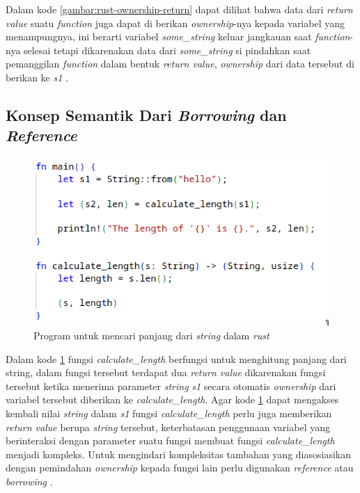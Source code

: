Dalam kode \ref{gambar:rust-ownership-return} dapat dilihat bahwa data dari \emph{return value} suatu \emph{function} juga dapat di berikan \emph{ownership}-nya kepada variabel yang menampungnya, ini berarti variabel \emph{some\_string} keluar jangkauan saat \emph{function}-nya selesai tetapi dikarenakan data dari \emph{some\_string} si pindahkan saat pemanggilan \emph{function} dalam bentuk \emph{return value},  \emph{ownership} dari data tersebut di berikan ke \emph{s1} \citep{rustbook}.

\subsection{Konsep Semantik Dari \emph{Borrowing} dan \emph{Reference}}

\begin{figure}[H]
  \centering
	\includegraphics[keepaspectratio, width=12cm]{gambar/print-string-and-length.png}
  \caption{Program untuk mencari panjang dari \emph{string} dalam \emph{rust} \citep{rustbook}}
	\label{gambar:rust-length-string}
\end{figure}

Dalam kode \ref{gambar:rust-length-string} fungsi \emph{calculate\_length} berfungsi untuk menghitung panjang dari string, dalam fungsi tersebut terdapat dua \emph{return value} dikarenakan fungsi tersebut ketika menerima parameter \emph{string} \emph{s1} secara otomatis \emph{ownership} dari variabel tersebut diberikan ke \emph{calculate\_length}. Agar kode \ref{gambar:rust-length-string} dapat mengakses kembali nilai \emph{string} dalam \emph{s1} fungsi \emph{calculate\_length} perlu juga memberikan \emph{return value} berupa \emph{string} tersebut, keterbatasan penggunaan variabel yang berinteraksi dengan parameter suatu fungsi membuat fungsi \emph{calculate\_length} menjadi kompleks. Untuk mengindari kompleksitas tambahan yang diasosiasikan dengan pemindahan \emph{ownership} kepada fungsi lain perlu digunakan \emph{reference} atau \emph{borrowing} \citep{rustbook}. 

